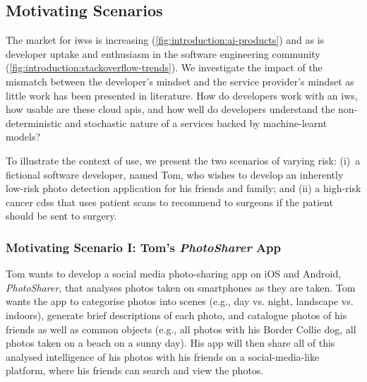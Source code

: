 \subsection{Motivating Scenarios}
\label{ssec:introduction:motivation:scenario}

The market for \glspl{iws} is increasing (\cref{fig:introduction:ai-products}) and as is developer uptake and enthusiasm in the software engineering community (\cref{fig:introduction:stackoverflow-trends}). We investigate the impact of the mismatch between the developer's mindset and the service provider's mindset as little work has been presented in literature. How do developers work with an \gls{iws}, how usable are these cloud \glspl{api}, and how well do developers understand the non-deterministic and stochastic nature of a services backed by machine-learnt models? 

To illustrate the context of use, we present the two scenarios of varying risk: (i)~a fictional software developer, named Tom, who wishes to develop an inherently low-risk photo detection application for his friends and family; and (ii) a high-risk cancer \gls{cdss} that uses patient scans to recommend to surgeons if the patient should be sent to surgery.
  
\subsubsection{Motivating Scenario I: Tom's \textit{PhotoSharer} App}
\label{ssec:introduction:motivation:scenario:pam}

Tom wants to develop a social media photo-sharing app on iOS and Android, \textit{PhotoSharer}, that analyses photos taken on smartphones as they are taken. Tom wants the app to categorise photos into scenes (e.g., day vs. night, landscape vs. indoors), generate brief descriptions of each photo, and catalogue photos of his friends as well as common objects (e.g., all photos with his Border Collie dog, all photos taken on a beach on a sunny day). His app will then share all of this analysed intelligence of his photos with his friends on a social-media-like platform, where his friends can search and view the photos.

